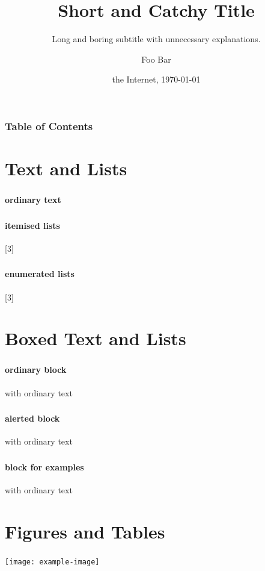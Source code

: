 \documentclass[10pt,compress,
               xcolor={dvipsnames,table},
               hyperref={breaklinks}
              ]{beamer}
\title{Short and Catchy Title}
\subtitle{Long and boring subtitle with unnecessary explanations.}
\author[F. Bar]{Foo Bar}
\institute[Baz Inst.]{Baz Insititute}
\date{the Internet, \today}
\begin{document}
\frame[plain]{\titlepage}

\begin{frame}
  \frametitle{Table of Contents}
  \tableofcontents
\end{frame}

\section{Text and Lists}
\begin{frame}
\frametitle{\insertsection}
\framesubtitle{ordinary text}
\blindtext
\end{frame}

\begin{frame}
\frametitle{\insertsection}
\framesubtitle{itemised lists}
[3]
\end{frame}

\begin{frame}
\frametitle{\insertsection}
\framesubtitle{enumerated lists}
[3]
\end{frame}

\section{Boxed Text and Lists}
\begin{frame}
\frametitle{\insertsection}
\framesubtitle{ordinary block}
\begin{block}{with ordinary text}
\blindtext
\end{block}
\end{frame}

\begin{frame}
\frametitle{\insertsection}
\framesubtitle{alerted block}
\begin{alertblock}{with ordinary text}
\blindtext
\end{alertblock}
\end{frame}

\begin{frame}
\frametitle{\insertsection}
\framesubtitle{block for examples}
\begin{exampleblock}{with ordinary text}
\blindtext
\end{exampleblock}
\end{frame}

\section{Figures and Tables}
\begin{frame}
\frametitle{\insertsection}
\centering
\texttt{[image: example-image]}
\end{frame}
\end{document}
